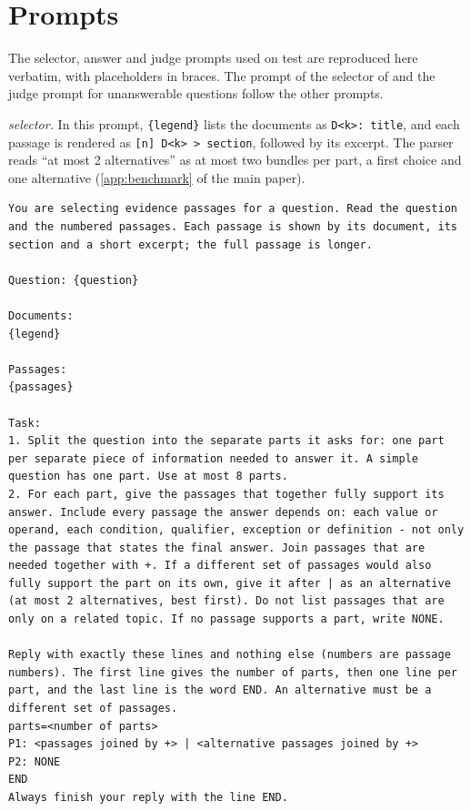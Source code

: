 \documentclass[preprint,12pt]{elsarticle}
\begin{document}
\section{Prompts}
\label{app:prompts}
The selector, answer and judge prompts used on test are reproduced here verbatim, with placeholders in braces. The prompt of the selector of \setr{} and the judge prompt for unanswerable questions follow the other prompts.

\emph{\lexb{} selector.} In this prompt, \texttt{\{legend\}} lists the documents as \texttt{D<k>: title}, and each passage is rendered as \texttt{[n] D<k> > section}, followed by its excerpt. The parser reads ``at most 2 alternatives'' as at most two bundles per part, a first choice and one alternative (\ref{app:benchmark} of the main paper).
\begin{lstlisting}
You are selecting evidence passages for a question. Read the question and the numbered passages. Each passage is shown by its document, its section and a short excerpt; the full passage is longer.

Question: {question}

Documents:
{legend}

Passages:
{passages}

Task:
1. Split the question into the separate parts it asks for: one part per separate piece of information needed to answer it. A simple question has one part. Use at most 8 parts.
2. For each part, give the passages that together fully support its answer. Include every passage the answer depends on: each value or operand, each condition, qualifier, exception or definition - not only the passage that states the final answer. Join passages that are needed together with +. If a different set of passages would also fully support the part on its own, give it after | as an alternative (at most 2 alternatives, best first). Do not list passages that are only on a related topic. If no passage supports a part, write NONE.

Reply with exactly these lines and nothing else (numbers are passage numbers). The first line gives the number of parts, then one line per part, and the last line is the word END. An alternative must be a different set of passages.
parts=<number of parts>
P1: <passages joined by +> | <alternative passages joined by +>
P2: NONE
END
Always finish your reply with the line END.
\end{lstlisting}
\end{document}
